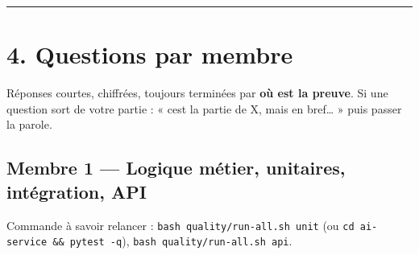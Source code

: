 \documentclass[
  11pt,
]{article}
\begin{document}
\begin{center}\rule{0.5\linewidth}{0.5pt}\end{center}

\section{4. Questions par membre}\label{4-questions-par-membre}

Réponses courtes, chiffrées, toujours terminées par \textbf{où est la
preuve}. Si une question sort de votre partie : « c\textquotesingle est
la partie de X, mais en bref\ldots{} » puis passer la parole.

\subsection{Membre 1 --- Logique métier, unitaires, intégration,
API}\label{membre-1--logique-muxe9tier-unitaires-intuxe9gration-api}

Commande à savoir relancer :
\texttt{bash\ quality/}\allowbreak{}\texttt{run-}\allowbreak{}\texttt{all.}\allowbreak{}\texttt{sh\ unit}
(ou
\texttt{cd\ ai-}\allowbreak{}\texttt{service\ \&\&\ pytest\ -}\allowbreak{}\texttt{q}),
\texttt{bash\ quality/}\allowbreak{}\texttt{run-}\allowbreak{}\texttt{all.}\allowbreak{}\texttt{sh\ api}.
\end{document}
